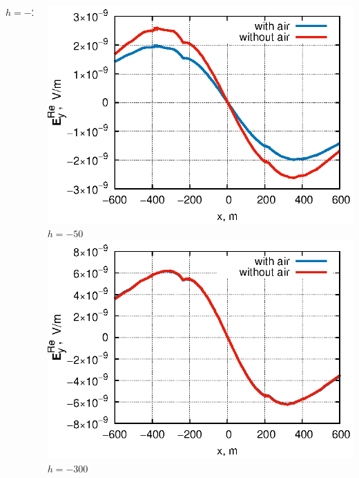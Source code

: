 \documentclass[aspectratio=43]{beamer}
\begin{document}
\begin{frame}
\begin{columns}[t,totalwidth=\linewidth]
\begin{column}{.5\linewidth}
\begin{center}
			\tiny{$h=-200$} \\
			\end{center}
		\end{column}
		\begin{column}{.5\linewidth}
			\vspace{-1.7em}
			\begin{center}
			\includegraphics[width=\textwidth,height=0.4\textheight,keepaspectratio]{deep_-50.eps} \\
			\vspace{-0.1em}
			\tiny{$h=-50$} \\
			\includegraphics[width=\textwidth,height=0.4\textheight,keepaspectratio]{deep_-300.eps} \\
			\vspace{-0.1em}
			\tiny{$h=-300$} \\
			\end{center}
		\end{column}
	\end{columns}
\end{frame}
\end{document}
